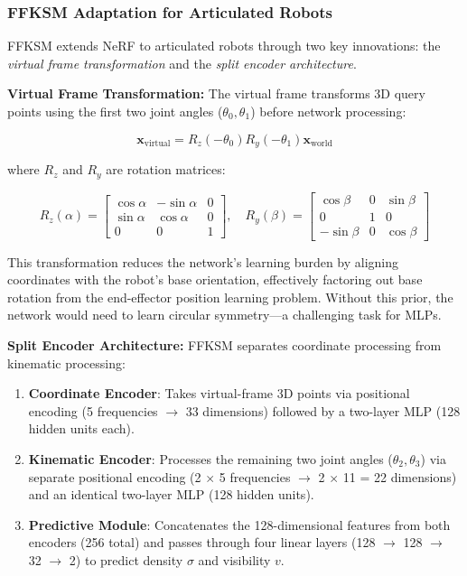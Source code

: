 ﻿\documentclass[12pt,a4paper,oneside]{report}
\begin{document}
\subsubsection{FFKSM Adaptation for Articulated Robots}

FFKSM extends NeRF to articulated robots through two key innovations: the \textit{virtual frame transformation} and the \textit{split encoder architecture}.

\textbf{Virtual Frame Transformation:} The virtual frame transforms 3D query points using the first two joint angles ($\theta_0, \theta_1$) before network processing:

\begin{equation}
\mathbf{x}_{\text{virtual}} = R_z(-\theta_0) R_y(-\theta_1) \mathbf{x}_{\text{world}}
\end{equation}

where $R_z$ and $R_y$ are rotation matrices:

\begin{equation}
R_z(\alpha) = \begin{bmatrix}
\cos\alpha & -\sin\alpha & 0 \\
\sin\alpha & \cos\alpha & 0 \\
0 & 0 & 1
\end{bmatrix}, \quad
R_y(\beta) = \begin{bmatrix}
\cos\beta & 0 & \sin\beta \\
0 & 1 & 0 \\
-\sin\beta & 0 & \cos\beta
\end{bmatrix}
\end{equation}

This transformation reduces the network's learning burden by aligning coordinates with the robot's base orientation, effectively factoring out base rotation from the end-effector position learning problem. Without this prior, the network would need to learn circular symmetry---a challenging task for MLPs.

\textbf{Split Encoder Architecture:} FFKSM separates coordinate processing from kinematic processing:

\begin{enumerate}
    \item \textbf{Coordinate Encoder}: Takes virtual-frame 3D points via positional encoding (5 frequencies $\rightarrow$ 33 dimensions) followed by a two-layer MLP (128 hidden units each).
    \item \textbf{Kinematic Encoder}: Processes the remaining two joint angles ($\theta_2, \theta_3$) via separate positional encoding (2 $\times$ 5 frequencies $\rightarrow$ 2 $\times$ 11 = 22 dimensions) and an identical two-layer MLP (128 hidden units).
    \item \textbf{Predictive Module}: Concatenates the 128-dimensional features from both encoders (256 total) and passes through four linear layers (128 $\rightarrow$ 128 $\rightarrow$ 32 $\rightarrow$ 2) to predict density $\sigma$ and visibility $v$.
\end{enumerate}
\end{document}
